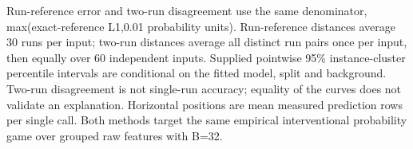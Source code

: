 Run-reference error and two-run disagreement use the same denominator, max(exact-reference L1,0.01 probability units). Run-reference distances average 30 runs per input; two-run distances average all distinct run pairs once per input, then equally over 60 independent inputs. Supplied pointwise 95\% instance-cluster percentile intervals are conditional on the fitted model, split and background. Two-run disagreement is not single-run accuracy; equality of the curves does not validate an explanation. Horizontal positions are mean measured prediction rows per single call. Both methods target the same empirical interventional probability game over grouped raw features with B=32.
